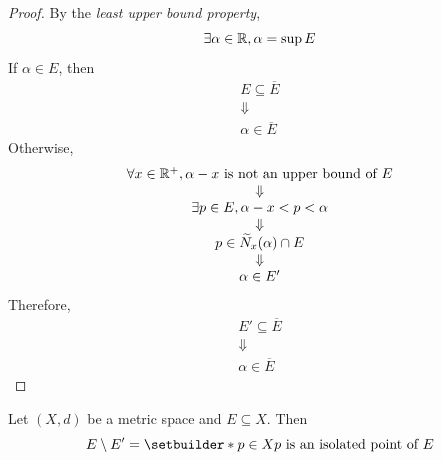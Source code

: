 \begin{proof}
    By the \emph{least upper bound property},
    \[
    \exists \alpha \in \mathbb{R}, \alpha = \sup E
    \]
    If $\alpha \in E$, then
    \[
    \begin{array}{c}
        E \subseteq \overline{E} \\
        \Downarrow \\
        \alpha \in \overline{E}
    \end{array}
    \]
    Otherwise,
    \[
    \begin{array}{c}
        \forall x \in \mathbb{R}^{+}, \alpha - x \text{ is not an upper bound of } E \\
        \Downarrow \\
        \exists p \in E, \alpha - x < p < \alpha \\
        \Downarrow \\
        p \in \widetilde{N}_{x}(\alpha) \cap E \\
        \Downarrow \\
        \alpha \in E'
    \end{array}
    \]
    Therefore,
    \[
    \begin{array}{c}
        E' \subseteq \overline{E} \\
        \Downarrow \\
        \alpha \in \overline{E}
    \end{array}
    \]
\end{proof}


\bigskip

\begin{theorem} \label{an:thm:isolated-points}
    Let $(X, d)$ be a metric space and $E \subseteq X$. Then
    \[
    E \setminus E' = \setbuilder*{p \in X}{p \text{ is an isolated point of } E}
    \]
\end{theorem}

